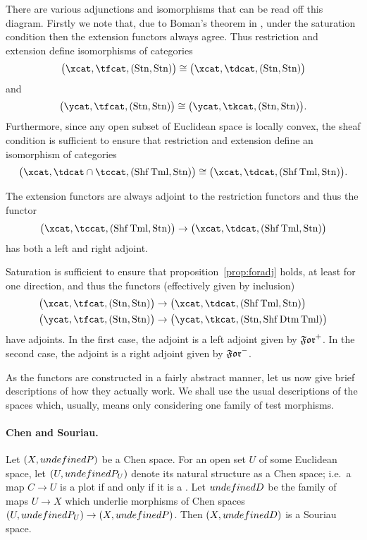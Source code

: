 \documentclass[%
a4paper,%
arxiv,%
defaults
]{myclass}
\begin{document}
There are various adjunctions and isomorphisms that can be read off this diagram.
Firstly we note that, due to Boman's theorem in \cite{jb3}, under the saturation condition then the extension functors always agree.
Thus restriction and extension define isomorphisms of categories
%
\[
  \big(\xcat, \tfcat, (\Sat, \Sat)\big) \cong \big(\xcat, \tdcat,(\Sat,\Sat)\big)
\]
%
and
%
\[
  \big(\ycat, \tfcat, (\Sat, \Sat)\big) \cong \big(\ycat, \tkcat, (\Sat,\Sat)\big).
\]
%
Furthermore, since any open subset of Euclidean space is locally convex, the sheaf condition is sufficient to ensure that restriction and extension define an isomorphism of categories
%
\[
  \big(\xcat, \tdcat \cap \tccat, (\Sheaf \Term,\Sat)\big) \cong      \big(\xcat, \tdcat, (\Sheaf \Term,\Sat)\big).
\]

The extension functors are always adjoint to the restriction functors and thus the functor
%
\[
  \big(\xcat, \tccat, (\Sheaf \Term,\Sat)\big) \to \big(\xcat, \tdcat, (\Sheaf \Term,\Sat)\big)
\]
%
has both a left and right adjoint.

Saturation is sufficient to ensure that proposition~\ref{prop:foradj} holds, at least for one direction, and thus the functors (effectively given by inclusion)
%
\begin{align*}
  \big(\xcat, \tfcat, (\Sat, \Sat)\big) &\to \big(\xcat, \tdcat, (\Sheaf\Term, \Sat)\big) \\
%
  \big(\ycat, \tfcat, (\Sat, \Sat)\big) &\to \big(\ycat, \tkcat, (\Sat,\Sheaf\Detm\Term)\big)
\end{align*}
%
have adjoints.
In the first case, the adjoint is a left adjoint given by \(\Mforfunc\).
In the second case, the adjoint is a right adjoint given by \(\Jforfunc\).

As the functors are constructed in a fairly abstract manner, let us now give brief descriptions of how they actually work.
We shall use the usual descriptions of the spaces which, usually, means only considering one family of test morphisms.

\paragraph{Chen and Souriau.}

Let \((X, \m{P})\) be a Chen space.
For an open set \(U\) of some Euclidean space, let \((U, \m{P}_U)\) denote its natural structure as a Chen space; i.e.\ a map \(C \to U\) is a plot if and only if it is a \cimap.
Let \(\m{D}\) be the family of maps \(U \to X\) which underlie morphisms of Chen spaces \((U, \m{P}_U) \to (X, \m{P})\).
Then \((X, \m{D})\) is a Souriau space.
\end{document}
